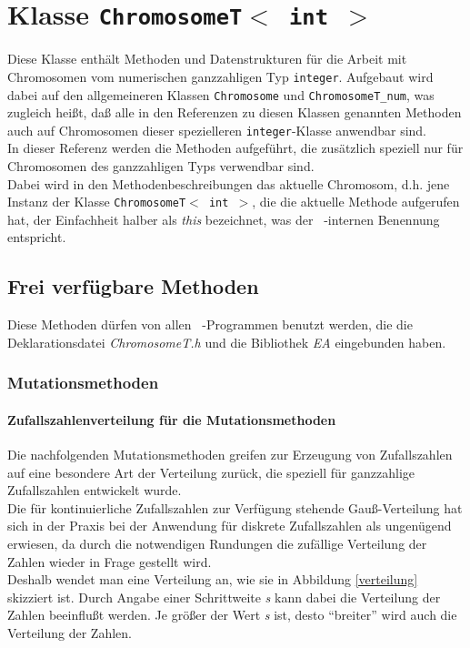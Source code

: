 \documentclass{report}
\begin{document}
\chapter{Klasse {\tt ChromosomeT$<$ int $>$}}
Diese Klasse enth\"alt Methoden und Datenstrukturen f\"ur die Arbeit
mit Chromosomen vom numerischen ganzzahligen Typ {\tt integer}.
Aufgebaut wird dabei auf den allgemeineren Klassen {\tt Chromosome} und
{\tt ChromosomeT\_num},
was zugleich hei{\ss}t, da{\ss} alle in den Referenzen zu diesen Klassen
genannten Methoden auch auf Chromosomen dieser spezielleren
{\tt integer}-Klasse anwendbar sind.\\
In dieser Referenz werden die Methoden aufgef\"uhrt, die zus\"atzlich speziell
nur f\"ur Chromosomen des ganzzahligen Typs verwendbar sind. \\
Dabei wird in
den Methodenbeschreibungen das aktuelle Chromosom, d.h. jene Instanz der Klasse
{\tt ChromosomeT$<$ int $>$}, die die aktuelle Methode aufgerufen hat, 
der Einfachheit halber als {\em this} bezeichnet, was der \cpp\ -internen 
Benennung entspricht.

\newpage
\section{Frei verf\"ugbare Methoden}
Diese Methoden d\"urfen von allen \cpp\ -Programmen benutzt werden, die
die Deklarationsdatei {\em ChromosomeT.h} und die Bibliothek {\em EA}
eingebunden haben.
 
\subsection{Mutationsmethoden}

\subsubsection{Zufallszahlenverteilung f\"ur die Mutationsmethoden}

Die nachfolgenden Mutationsmethoden greifen zur Erzeugung von
Zufallszahlen auf eine besondere Art der Verteilung zur\"uck,
die speziell f\"ur ganzzahlige Zufallszahlen entwickelt wurde.\\
Die f\"ur kontinuierliche Zufallszahlen zur Verf\"ugung stehende
Gau{\ss}-Verteilung hat sich in der Praxis bei der Anwendung
f\"ur diskrete Zufallszahlen als ungen\"ugend erwiesen, da
durch die notwendigen Rundungen die zuf\"allige Verteilung
der Zahlen wieder in Frage gestellt wird.\\
Deshalb wendet man eine Verteilung an, wie sie in 
Abbildung \ref{verteilung} skizziert ist. Durch Angabe einer
Schrittweite {\em s} kann dabei die Verteilung der Zahlen
beeinflu{\ss}t werden. Je gr\"o{\ss}er der Wert {\em s}
ist, desto ``breiter'' wird auch die Verteilung der Zahlen. 
\end{document}
